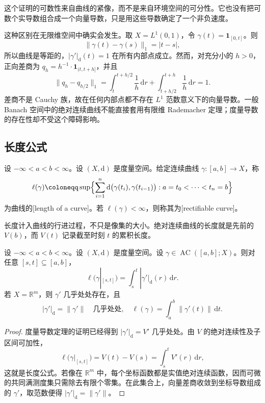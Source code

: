 这个证明的可数性来自曲线的紧像，而不是来自环境空间的可分性。它也没有把可数个实导数组合成一个向量导数，只是用这些导数确定了一个非负速度。

\ProseParagraphBreak

这种区别在无限维空间中确实会发生。取 \(X=L^1(0,1)\)，令 \(\gamma(t)=\mathbf1_{[0,t]}\)。则
\[
\|\gamma(t)-\gamma(s)\|_1=|t-s|,
\]
所以曲线是等距的，\(|\gamma'|_{\mathrm d}(t)=1\) 在所有内部点成立。然而，对充分小的 \(h>0\)，正向差商为 \(q_h=h^{-1}\cdot\mathbf1_{(t,t+h]}\)，并且
\[
\|q_h-q_{h/2}\|_1
=\int_t^{t+h/2}\frac1h\,\mathrm dr
+\int_{t+h/2}^{t+h}\frac1h\,\mathrm dr=1.
\]
差商不是 Cauchy 族，故在任何内部点都不存在 \(L^1\) 范数意义下的向量导数。一般 Banach 空间中的绝对连续曲线不能直接套用有限维 Rademacher 定理；度量导数的存在性却不受这个障碍影响。

\subsection{长度公式}
\label{b1:subsec:160503}

\begin{definition}
\label{b1:def:curve-length}
设 \(-\infty<a<b<\infty\)。设 \((X,\mathrm d)\) 是度量空间。给定连续曲线 \(\gamma:[a,b]\to X\)，称
\[
\ell(\gamma)
\coloneqq\sup\Bigl\{\sum_{i=1}^n \mathrm{d}\bigl(\gamma(t_i),\gamma(t_{i-1})\bigr):
a=t_0<\cdots<t_n=b\Bigr\}
\]
为曲线的[length of a curve]。若 \(\ell(\gamma)<\infty\)，则称其为[rectifiable curve]。
\end{definition}

长度计入曲线的行进过程，不只是像集的大小。绝对连续曲线的长度就是先前的 \(V(b)\)，而 \(V(t)\) 记录截至时刻 \(t\) 的累积长度。

\begin{theorem}[绝对连续曲线的长度公式]
\label{b1:thm:metric-curve-length}
设 \(-\infty<a<b<\infty\)。设 \((X,\mathrm d)\) 是度量空间。设 \(\gamma\in\operatorname{AC}([a,b];X)\)。则对任意 \([s,t]\subseteq[a,b]\)，
\[
\ell\bigl(\gamma|_{[s,t]}\bigr)
=\int_s^t|\gamma'|_{\mathrm d}(r)\,\mathrm dr.
\]
若 \(X=\mathbb R^m\)，则 \(\gamma'\) 几乎处处存在，且
\[
|\gamma'|_{\mathrm d}=\|\gamma'\|
\quad\text{几乎处处},
\quad
\ell(\gamma)=\int_a^b\|\gamma'(t)\|\,\mathrm dt.
\]
\end{theorem}
\begin{proof}
度量导数定理的证明已经得到 \(|\gamma'|_{\mathrm d}=V'\) 几乎处处。由 \(V\) 的绝对连续性及子区间可加性，
\[
\ell\bigl(\gamma|_{[s,t]}\bigr)
=V(t)-V(s)=\int_s^tV'(r)\,\mathrm dr,
\]
这就是长度公式。若像在 \(\mathbb R^m\) 中，每个坐标函数都是实值绝对连续函数，因而可微的共同满测度集只需除去有限个零集。在此集合上，向量差商收敛到坐标导数组成的 \(\gamma'\)，取范数便得 \(|\gamma'|_{\mathrm d}=\|\gamma'\|\)。
\end{proof}


